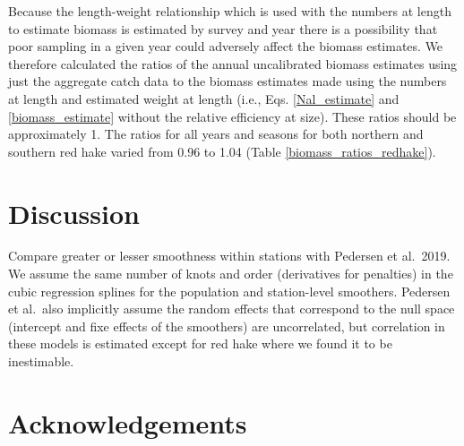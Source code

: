 \documentclass[]{article}
\begin{document}
Because the length-weight relationship which is used with the numbers at
length to estimate biomass is estimated by survey and year there is a
possibility that poor sampling in a given year could adversely affect
the biomass estimates. We therefore calculated the ratios of the annual
uncalibrated biomass estimates using just the aggregate catch data to
the biomass estimates made using the numbers at length and estimated
weight at length (i.e., Eqs. \ref{Nal_estimate} and
\ref{biomass_estimate} without the relative efficiency at size). These
ratios should be approximately 1. The ratios for all years and seasons
for both northern and southern red hake varied from 0.96 to 1.04 (Table
\ref{biomass_ratios_redhake}).

\hypertarget{discussion}{%
\section{Discussion}\label{discussion}}

Compare greater or lesser smoothness within stations with Pedersen et
al.~2019. We assume the same number of knots and order (derivatives for
penalties) in the cubic regression splines for the population and
station-level smoothers. Pedersen et al.~also implicitly assume the
random effects that correspond to the null space (intercept and fixe
effects of the smoothers) are uncorrelated, but correlation in these
models is estimated except for red hake where we found it to be
inestimable.

\hypertarget{acknowledgements}{%
\section*{Acknowledgements}\label{acknowledgements}}

\pagebreak



\hypertarget{refs}{}

\pagebreak
\end{document}
